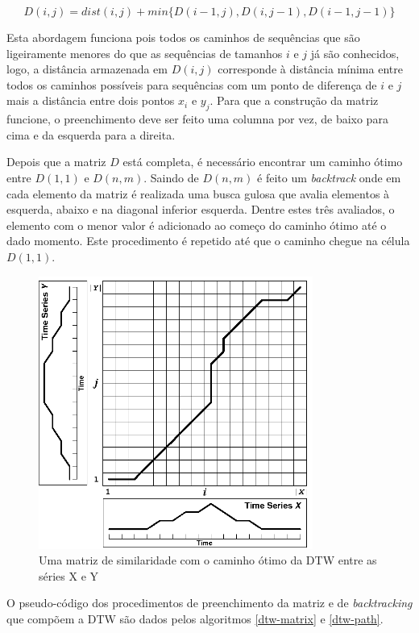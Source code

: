 \begin{equation*}
    D(i, j) = dist(i, j) + min\{D(i - 1, j), D(i, j - 1), D(i - 1, j - 1)\}
\end{equation*}

Esta abordagem funciona pois todos os caminhos de sequências que são ligeiramente menores do que as sequências de tamanhos $i$ e $j$ já são conhecidos, logo, a distância armazenada em $D(i, j)$ corresponde à distância mínima entre todos os caminhos possíveis para sequências com um ponto de diferença de $i$ e $j$ mais a distância entre dois pontos $x_i$ e $y_j$. Para que a construção da matriz funcione, o preenchimento deve ser feito uma columna por vez, de baixo para cima e da esquerda para a direita. 

Depois que a matriz $D$ está completa, é necessário encontrar um caminho ótimo entre $D(1, 1)$ e $D(n, m)$. Saindo de $D(n, m)$ é feito um \textit{backtrack} onde em cada elemento da matriz é realizada uma busca gulosa que avalia elementos à esquerda, abaixo e na diagonal inferior esquerda. Dentre estes três avaliados, o elemento com o menor valor é adicionado ao começo do caminho ótimo até o dado momento. Este procedimento é repetido até que o caminho chegue na célula $D(1, 1)$.

\begin{figure}[htb]
\centering
\includegraphics[width=9cm]{figuras/dtw_warp_path.png}
\caption{Uma matriz de similaridade com o caminho ótimo da DTW entre as séries X e Y\citep{salvador2007toward}}
\label{fig:dtw-matrix-and-path}
\end{figure}

O pseudo-código dos procedimentos de preenchimento da matriz \citep{hierarchical-time-clustering} e de \textit{backtracking} que compõem a DTW são dados pelos algoritmos \ref{dtw-matrix} e \ref{dtw-path}.



